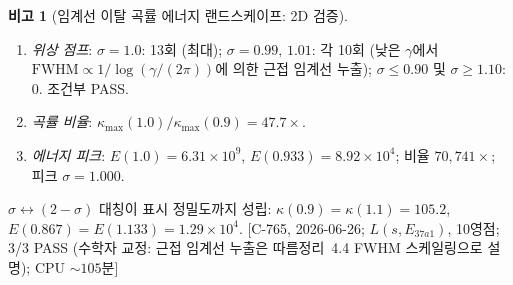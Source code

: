 \documentclass[11pt, a4paper]{article}
\theoremstyle{definition}
\newtheorem{remark}{비고}[section]
\theoremstyle{plain}
\begin{document}
\begin{remark}[임계선 이탈 곡률 에너지 랜드스케이프: 2D 검증]
\begin{enumerate}[label=(\roman*),nosep]
\item \emph{위상 점프}: $\sigma=1.0$: 13회 (최대);
  $\sigma=0.99,\,1.01$: 각 10회 (낮은 $\gamma$에서
  $\mathrm{FWHM}\propto 1/\!\log(\gamma/(2\pi))$에 의한 근접 임계선 누출);
  $\sigma\le0.90$ 및 $\sigma\ge1.10$: 0.
  조건부 PASS.
\item \emph{곡률 비율}:
  $\kappa_{\max}(1.0)/\kappa_{\max}(0.9)=47.7\times$.
\item \emph{에너지 피크}: $E(1.0)=6.31\times10^9$,
  $E(0.933)=8.92\times10^4$; 비율 $70{,}741\times$;
  피크 $\sigma=1.000$.
\end{enumerate}
$\sigma\leftrightarrow(2{-}\sigma)$ 대칭이 표시 정밀도까지 성립:
$\kappa(0.9)=\kappa(1.1)=105.2$,
$E(0.867)=E(1.133)=1.29\times10^4$.
[C-765, 2026-06-26; $L(s,E_{37a1})$,
10영점; 3/3 PASS (수학자 교정: 근접 임계선 누출은
따름정리~4.4 FWHM 스케일링으로 설명); CPU ${\sim}105$분]
\end{remark}
\end{document}
